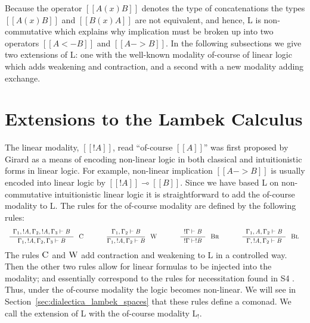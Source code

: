 \documentclass{llncs}
\newcommand{\LB}{\text{L}_!}
\begin{document}
Because the operator $[[A (x) B]]$ denotes the type of concatenations
the types $[[A (x) B]]$ and $[[B (x) A]]$ are not equivalent, and
hence, \textsf{L} is non-commutative which explains why implication
must be broken up into two operators $[[A <- B]]$ and $[[A -> B]]$.
In the following subsections we give two extensions of L: one with the
well-known modality of-course of linear logic which adds weakening and
contraction, and a second with a new modality adding exchange.

\section{
Extensions to the Lambek Calculus}
\label{subsec:the_lambek_calculus_with_the_weakening_and_contraction_modality}

The linear modality, $[[! A]]$, read ``of-course $[[A]]$'' was first
proposed by Girard \cite{Girard:1987} as a means of encoding
non-linear logic in both classical and intuitionistic forms in linear
logic.  For example, non-linear implication $[[A -> B]]$ is usually
encoded into linear logic by $[[!A]] \multimap [[B]]$. Since we have
based L on non-commutative intuitionistic linear logic it is
straightforward to add the of-course modality to L.  The rules for the
of-course modality are defined by the following rules:
\[
\small
\begin{array}{ccccccccccc}
  \LdruleC{} & \quad & \LdruleW{} & \quad & 
  \LdruleBr{} & \quad & \LdruleBl{}
\end{array}
\]
The rules $\textsc{C}$ and $\textsc{W}$ add contraction and
weakening to L in a controlled way.  Then the other two rules allow
for linear formulas to be injected into the modality; and essentially
correspond to the rules for necessitation found in S4
\cite{bierman2000}.  Thus, under the of-course modality the logic
becomes non-linear. We will see in
Section~\ref{sec:dialectica_lambek_spaces} that these rules define a
comonad.  We call the extension of L with the of-course modality
$\LB$.
\end{document}
